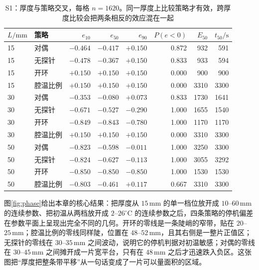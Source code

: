 \begin{table}[t]
\centering
\caption{S1：厚度与策略交叉，每格 \(n=1620\)。同一厚度上比较策略才有效，跨厚度比较会把两条相反的效应混在一起}
\label{tab:s1L}
\setlength{\tabcolsep}{3.6pt}
{\small
\begin{tabular}{llrrrrrr}
\toprule
\(L/\mathrm{mm}\) & 策略 & \(e_{10}\) & \(e_{50}\) & \(e_{90}\) & \(P(e{<}0)\) & \(E_{50}\) & \(t_{50}/\mathrm{s}\) \\
\midrule
15 & 对偶 & \(-0.464\) & \(-0.417\) & \(+0.150\) & 0.872 & 932 & 591 \\
15 & 无探针 & \(-0.478\) & \(-0.367\) & \(+0.150\) & 0.833 & 933 & 594 \\
15 & 开环 & \(+0.150\) & \(+0.150\) & \(+0.150\) & 0.000 & 900 & 900 \\
15 & 腔温比例 & \(+0.150\) & \(+0.150\) & \(+0.150\) & 0.000 & 3310 & 3300 \\
30 & 对偶 & \(-0.353\) & \(-0.080\) & \(+0.073\) & 0.833 & 1730 & 1641 \\
30 & 无探针 & \(-0.671\) & \(-0.527\) & \(-0.290\) & 1.000 & 1655 & 1540 \\
30 & 开环 & \(-0.849\) & \(-0.843\) & \(-0.780\) & 1.000 & 1170 & 1170 \\
30 & 腔温比例 & \(+0.150\) & \(+0.150\) & \(+0.150\) & 0.000 & 3310 & 3300 \\
50 & 对偶 & \(-0.823\) & \(-0.598\) & \(-0.011\) & 1.000 & 3250 & 3300 \\
50 & 无探针 & \(-0.824\) & \(-0.627\) & \(-0.113\) & 1.000 & 3055 & 3292 \\
50 & 开环 & \(-0.850\) & \(-0.850\) & \(-0.850\) & 1.000 & 1530 & 1530 \\
50 & 腔温比例 & \(-0.803\) & \(-0.461\) & \(+0.117\) & 0.667 & 3310 & 3300 \\
\bottomrule
\end{tabular}}
\end{table}

图\ref{fig:phase}{}给出本章的核心结果：把厚度从 \(15\,\mathrm{mm}\) 的单一档位放开成 \(10\)--\(60\,\mathrm{mm}\) 的连续参数、把初温从两档放开成 \(2\)--\(26^\circ\mathrm{C}\) 的连续参数之后，四条策略的停机偏差在参数平面上呈现出完全不同的几何。开环的零线是一条陡峭的窄带，贴在 \(20\)--\(25\,\mathrm{mm}\)；腔温比例的零线同样陡，位置在 \(48\)--\(52\,\mathrm{mm}\)，且其右侧是一整片正值区；无探针的零线在 \(30\)--\(35\,\mathrm{mm}\) 之间波动，说明它的停机判据对初温敏感；对偶的零线在 \(30\)--\(45\,\mathrm{mm}\) 之间摊开成一片宽平台，只有在 \(48\,\mathrm{mm}\) 之后才迅速跌入负区。这张图把“厚度把整条带平移”从一句话变成了一片可以量面积的区域。

